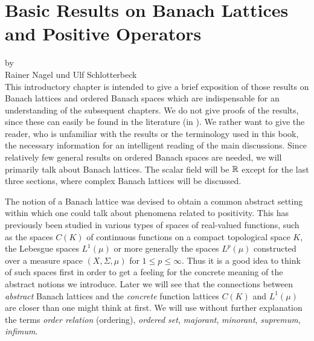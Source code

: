 \chapter{Basic Results on Banach Lattices and Positive Operators}\label{chap:c1}
{\Large
\vspace*{-.75cm}
by \\[.25em]
Rainer Nagel und Ulf Schlotterbeck
\vspace{.75cm}
\\
}
This introductory chapter is intended to give a brief exposition of those results on Banach lattices and ordered Banach spaces which are indispensable for an understanding of the subsequent chapters.
We do not give proofs of the results, since these can easily be found in the literature (\eg in \citet{schaefer:1974}).
We rather want to give the reader, who is unfamiliar with the results or the terminology used in this book, the necessary information for an intelligent reading of the main discussions.
Since relatively few general results on ordered Banach spaces are needed, we will primarily talk about Banach lattices.
The scalar field will be $\mathbb{R}$ except for the last three sections, where complex Banach lattices will be discussed.

The notion of a Banach lattice was devised to obtain a common abstract setting within which one could talk about phenomena related to positivity.
This has previously been studied in various types of spaces of real-valued functions, such as the spaces $ C(K) $ of continuous functions on a compact topological space $ K $, the Lebesgue spaces $ L^{1}(\mu) $ or more generally the spaces $ L^{p}(\mu) $ constructed over a measure space $ (X,\Sigma,\mu) $ for $ 1 \leq p \leq \infty $.
Thus it is a good idea to think of such spaces first in order to get a feeling for the concrete meaning of the abstract notions we introduce.
Later we will see that the connections between \emph{abstract} Banach lattices and the \emph{concrete} function lattices $ C(K) $ and $ L^{1}(\mu) $ are closer than one might think at first.
We will use without further explanation the terms \emph{order relation} (ordering), \emph{ordered set}, \emph{majorant}, \emph{minorant}, \emph{supremum}, \emph{infimum}.

